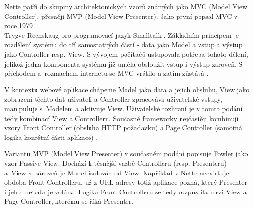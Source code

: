 Nette patří do skupiny architektonických vzorů známých jako MVC (Model View Controller), přesněji MVP (Model View Presenter). Jako první popsal MVC v roce 1979\\ Trygve Reenskaug pro programovací jazyk Smalltalk \cite{FowlerMVC}. Základním principem je rozdělení systému do tří samostatných částí - data jako Model a vstup a výstup jako Controller resp. View. S vývojem počítačů ustupovala potřeba tohoto dělení, jelikož jedna komponenta systému již uměla obsloužit vstup i výstup zároveň. S příchodem a~rozmachem internetu se MVC vrátilo a zatím zůstává \cite{zdrojakMVC}.

V kontextu webové aplikace chápeme Model jako data a jejich obsluhu, View jako zobrazení těchto dat uživateli a Controller zpracovává uživatelské vstupy, manipuluje s~Modelem a aktivuje View. Uživatelské rozhraní je v tomto podání tedy kombinací View a Controlleru. Současné frameworky nejčastěji kombinují vzory Front Controller (obsluha HTTP požadavku) a Page Controller (samotná logika konrétní části aplikace) \cite{FowlerMVC}.

Variantu MVP (Model View Presenter) v současném podání popisuje Fowler\cite{FowlerPassiveView} jako vzor Passive View. Dochází k těsnější vazbě Controlleru (resp. Presenteru) a~View a~zároveň je Model izolován od View. Například v Nette neexistuje obdoba Front Controlleru, už z URL adresy totiž aplikace pozná, který Presenter i jeho metoda je volána. Logika Front Controlleru se tedy rozpustila mezi View a Page Controller, kterému se říká Presenter.